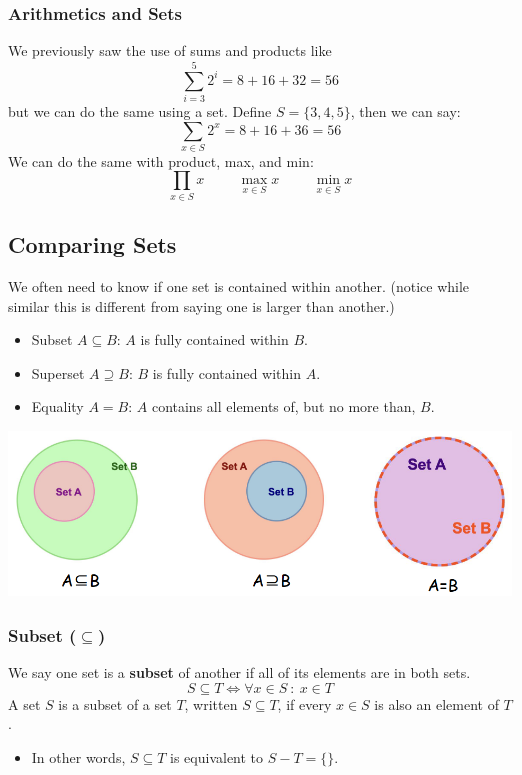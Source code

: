 \documentclass[10pt]{article}
\begin{document}
\subsubsection*{Arithmetics and Sets}
We previously saw the use of sums and products like
\[\sum_{i = 3}^5 2^i = 8 + 16 + 32 = 56\]
but we can do the same using a set.  Define $S = \{3, 4, 5\}$, then we can say:
\[\sum_{x \in S} 2^x = 8 + 16 + 36 = 56\]
We can do the same with product, max, and min:
\[\prod_{x \in S} x \hspace{1cm} \max_{x \in S} x \hspace{1cm} \min_{x \in S} x\]

\subsection*{Comparing Sets}
We often need to know if one set is contained within another.  (notice while similar this is different from saying one is larger than another.)
\begin{itemize}
	\item Subset $A \subseteq B$: $A$ is fully contained within $B$.
	\item Superset $A \supseteq B$: $B$ is fully contained within $A$.
	\item Equality $A = B$: $A$ contains all elements of, but no more than, $B$.
\end{itemize}
\begin{center} 
	\includegraphics*[width=\textwidth]{M2_2.png} 
\end{center}

\subsubsection*{Subset ($\subseteq$)}
We say one set is a \textbf{subset} of another if all of its elements are in both sets.
\[S \subseteq T \Leftrightarrow \forall x \in S \::\: x \in T\]
A set $S$ is a subset of a set $T$, written $S \subseteq T$, if every $x \in S$ is also an element of $T$.
\begin{itemize}
	\item In other words, $S \subseteq T$ is equivalent to $S - T = \{\}$.
\end{itemize}
\end{document}

